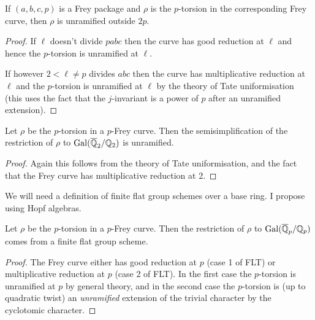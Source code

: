 \begin{theorem}\label{Frey_curve_unramified} If $(a,b,c,p)$ is a Frey package and $\rho$ is the $p$-torsion in the corresponding Frey curve, then $\rho$ is unramified outside $2p$.
\end{theorem}
\begin{proof}
  If $\ell$ doesn't divide $pabc$ then the curve has good reduction at $\ell$ and hence the $p$-torsion is unramified at $\ell$.

  If however $2<\ell\ne p$ divides $abc$ then the curve has multiplicative reduction at $\ell$ and the $p$-torsion is unramified at $\ell$ by the theory of Tate uniformisation (this uses the fact that the $j$-invariant is a power of $p$ after an unramified extension).
\end{proof}

\begin{theorem}\label{Frey_curve_at_2} Let $\rho$ be the $p$-torsion in a $p$-Frey curve. Then the semisimplification of the restriction of $\rho$ to $\operatorname{Gal}(\overline{\mathbb{Q}}_2/\mathbb{Q}_2)$ is unramified.
\end{theorem}
\begin{proof}
  Again this follows from the theory of Tate uniformisation, and the fact that the Frey curve has multiplicative reduction at 2.
\end{proof}

\begin{definition}\label{finite_flat_group_scheme} We will need a definition of finite flat group schemes over a base ring. I propose using Hopf algebras.
\end{definition}
  
\begin{theorem}\label{Frey_curve_finite_flat} Let $\rho$ be the $p$-torsion in a $p$-Frey curve. Then the restriction of $\rho$ to $\operatorname{Gal}(\overline{\mathbb{Q}}_p/\mathbb{Q}_p)$ comes from a finite flat group scheme.
\end{theorem}
\begin{proof} The Frey curve either has good reduction at $p$ (case 1 of FLT) or multiplicative reduction at $p$ (case 2 of FLT). In the first case the $p$-torsion is unramified at $p$ by general theory, and in the second case the $p$-torsion is (up to quadratic twist) an \emph{unramified} extension of the trivial character by the cyclotomic character.
\end{proof}

